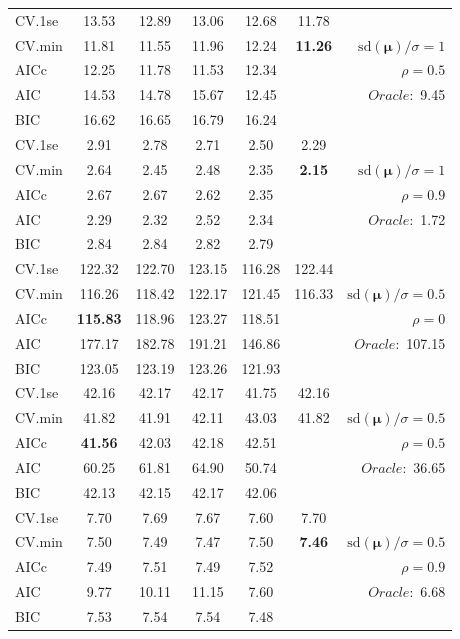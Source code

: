 \begin{table}
\begin{center}
\begin{tabular}{l*{5}{c}|r}
 \hline 
CV.1se & 13.53 & 12.89 & 13.06 & 12.68 & 11.78 & \\
CV.min & 11.81 & 11.55 & 11.96 & 12.24 & {\bf 11.26} &  $\mathrm{sd}(\mathbf{\mu})/\sigma=1$ \\
AICc & 12.25 & 11.78 & 11.53 & 12.34 & & $\rho=0.5$ \\
AIC & 14.53 & 14.78 & 15.67 & 12.45 & &  \multirow{2}{*}{$Oracle: $ 9.45} \\
BIC & 16.62 & 16.65 & 16.79 & 16.24 & &  \\
 \hline 
CV.1se & 2.91 & 2.78 & 2.71 & 2.50 & 2.29 & \\
CV.min & 2.64 & 2.45 & 2.48 & 2.35 & {\bf 2.15} &  $\mathrm{sd}(\mathbf{\mu})/\sigma=1$ \\
AICc & 2.67 & 2.67 & 2.62 & 2.35 & & $\rho=0.9$ \\
AIC & 2.29 & 2.32 & 2.52 & 2.34 & &  \multirow{2}{*}{$Oracle: $ 1.72} \\
BIC & 2.84 & 2.84 & 2.82 & 2.79 & &  \\
 \hline 
CV.1se & 122.32 & 122.70 & 123.15 & 116.28 & 122.44 & \\
CV.min & 116.26 & 118.42 & 122.17 & 121.45 & 116.33 &  $\mathrm{sd}(\mathbf{\mu})/\sigma=0.5$ \\
AICc & {\bf 115.83} & 118.96 & 123.27 & 118.51 & & $\rho=0$ \\
AIC & 177.17 & 182.78 & 191.21 & 146.86 & &  \multirow{2}{*}{$Oracle: $ 107.15} \\
BIC & 123.05 & 123.19 & 123.26 & 121.93 & &  \\
 \hline 
CV.1se & 42.16 & 42.17 & 42.17 & 41.75 & 42.16 & \\
CV.min & 41.82 & 41.91 & 42.11 & 43.03 & 41.82 &  $\mathrm{sd}(\mathbf{\mu})/\sigma=0.5$ \\
AICc & {\bf 41.56} & 42.03 & 42.18 & 42.51 & & $\rho=0.5$ \\
AIC & 60.25 & 61.81 & 64.90 & 50.74 & &  \multirow{2}{*}{$Oracle: $ 36.65} \\
BIC & 42.13 & 42.15 & 42.17 & 42.06 & &  \\
 \hline 
CV.1se & 7.70 & 7.69 & 7.67 & 7.60 & 7.70 & \\
CV.min & 7.50 & 7.49 & 7.47 & 7.50 & {\bf 7.46} &  $\mathrm{sd}(\mathbf{\mu})/\sigma=0.5$ \\
AICc & 7.49 & 7.51 & 7.49 & 7.52 & & $\rho=0.9$ \\
AIC & 9.77 & 10.11 & 11.15 & 7.60 & &  \multirow{2}{*}{$Oracle: $ 6.68} \\
BIC & 7.53 & 7.54 & 7.54 & 7.48 & &  \\
 \hline 
\end{tabular}
\end{center}
\vspace{-1cm}
\end{table}




